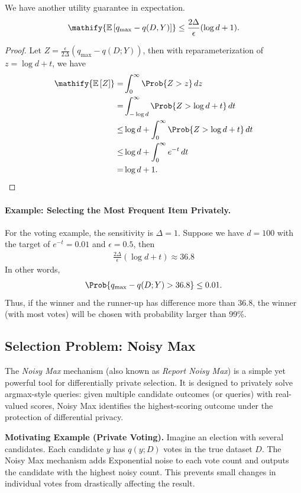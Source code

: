 \documentclass[11pt, a4paper]{article}
\newcommand{\E}[1]{\mathify{\mathbb{E}\left[#1\right]}}
\begin{document}
We have another utility guarantee in expectation.
\[
    \E{q_{\max} - q(D, Y)} \leq \frac{2\Delta}{\epsilon} (\log d + 1).
\]
\begin{proof}
 Let $Z = \frac{\epsilon}{2\Delta}(q_{\max} - q(D;Y))$, then with reparameterization of $z = \log d + t$, we have
 \begin{align}
    \E{Z} =& \int_0^\infty \Prob{Z>z}\, dz\\
     =& \int_{-\log d}^\infty \Prob{Z>\log d + t}\, dt\\
     \leq& \log d + \int_{0}^\infty \Prob{Z>\log d + t}\, dt\\
     \leq& \log d + \int_{0}^\infty e^{-t}\, dt\\
     =& \log d + 1.
 \end{align}
\end{proof}

\paragraph{Example: Selecting the Most Frequent Item Privately.}
For the voting example, the sensitivity is $\Delta =1$.
Suppose we have $d=100$ with the target of $e^{-t} = 0.01$ and $\epsilon=0.5$, then
\begin{align}
    \frac{2\Delta}{\epsilon} (\log d + t) \approx 36.8 
\end{align}
In other words,
\begin{align}
    \Prob{q_{\max} - q(D;Y) > 36.8}\leq 0.01.
\end{align}
Thus, if the winner and the runner-up has difference more than 36.8,
the winner (with most votes) will be chosen with probability larger than 99\%.


\subsection{Selection Problem: Noisy Max}

The \emph{Noisy Max} mechanism (also known as \emph{Report Noisy Max}) is a simple yet powerful tool for differentially private selection. It is designed to privately solve argmax-style queries: given multiple candidate outcomes (or queries) with real-valued scores, Noisy Max identifies the highest-scoring outcome under the protection of differential privacy.

\vspace{0.5em}
\noindent\textbf{Motivating Example (Private Voting).}
Imagine an election with several candidates.
Each candidate $y$ has $q(y; D)$ votes in the true dataset $D$.
The Noisy Max mechanism adds Exponential noise to each vote count and outputs the candidate with the highest noisy count.
This prevents small changes in individual votes from drastically affecting the result.
\end{document}
